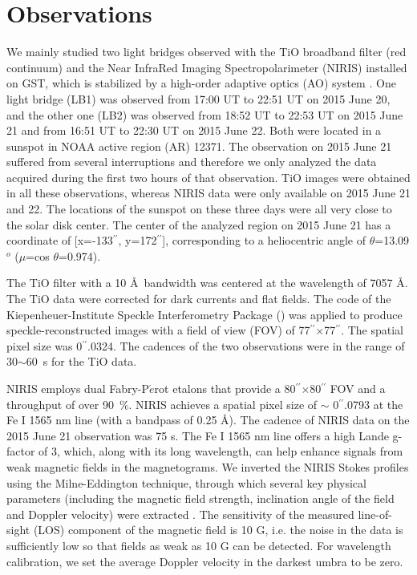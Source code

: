 \documentclass[preprint2]{aastex}
\begin{document}
\section{Observations}
We mainly studied two light bridges observed with the TiO broadband filter (red continuum) and the Near InfraRed Imaging Spectropolarimeter (NIRIS) installed on GST, which is stabilized by a high-order adaptive optics (AO) system \citep{Shumko2014}. One light bridge (LB1) was observed from 17:00 UT to 22:51 UT on 2015 June 20, and the other one (LB2) was observed from 18:52 UT to 22:53 UT on 2015 June 21 and from 16:51 UT to 22:30 UT on 2015 June 22. Both were located in a sunspot in NOAA active region (AR) 12371. The observation on 2015 June 21 suffered from several interruptions and therefore we only analyzed the data acquired during the first two hours of that observation. TiO images were obtained in all these observations, whereas NIRIS data were only available on 2015 June 21 and 22. The locations of the sunspot on these three days were all very close to the solar disk center. The center of the analyzed region on 2015 June 21 has a coordinate of [x=-133$^{\prime\prime}$, y=172$^{\prime\prime}$], corresponding to a heliocentric angle of $\theta$=13.09$^o$ ($\mu$=cos $\theta$=0.974).

The TiO filter with a 10 \AA{}~bandwidth was centered at the wavelength of 7057 \AA{}. The TiO data were corrected for dark currents and flat fields. The code of the Kiepenheuer-Institute Speckle Interferometry Package (\cite{Woger2008}) was applied to produce speckle-reconstructed images with a field of view (FOV) of 77$^{\prime\prime}$$\times$77$^{\prime\prime}$. The spatial pixel size was 0$^{\prime\prime}$.0324. The cadences of the two observations were in the range of 30$\sim$60~s for the TiO data.

NIRIS employs dual Fabry-P$\acute{e}$rot etalons that provide a 80$^{\prime\prime}$$\times$80$^{\prime\prime}$ FOV and a throughput of over 90~\%. NIRIS achieves a spatial pixel size of $\sim$  0$^{\prime\prime}$.0793 at the Fe I 1565 nm line (with a bandpass of 0.25 \AA{}). The cadence of NIRIS data on the 2015 June 21 observation was 75 s. The Fe I 1565 nm line offers a high Lande g-factor of 3, which, along with its long wavelength, can help enhance signals from weak magnetic fields in the magnetograms. We inverted the NIRIS Stokes profiles using the Milne-Eddington technique, through which several key physical parameters (including the magnetic field strength, inclination angle of the field and Doppler velocity) were extracted \citep{Lites2007}. The sensitivity of the measured line-of-sight (LOS) component of the magnetic field is 10 G, i.e. the noise in the data is sufficiently low so that fields as weak as 10 G can be detected. For wavelength calibration, we set the average Doppler velocity in the darkest umbra to be zero.
\end{document}
